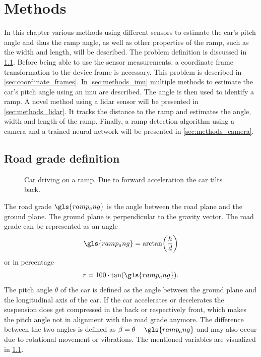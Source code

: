 \chapter{Methods}
\label{ch:Methods}
In this chapter various methods using different sensors to estimate the car's pitch angle and thus the ramp angle, as well as other properties of the ramp, such as the width and length, will be described.
The problem definition is discussed in \cref{sec:road_grade_definition}.
Before being able to use the sensor measurements, a coordinate frame transformation to the device frame is necessary.
This problem is described in \cref{sec:coordinate_frames}.
In \cref{sec:methods_imu} multiple methods to estimate the car's pitch angle using an \gls{imu} are described.
The angle is then used to identify a ramp.
A novel method using a \gls{lidar} sensor will be presented in \cref{sec:methods_lidar}.
It tracks the distance to the ramp and estimates the angle, width and length of the ramp.
Finally, a ramp detection algorithm using a camera and a trained neural network will be presented in \cref{sec:methods_camera}.


\section{Road grade definition}
\label{sec:road_grade_definition}
\begin{figure}[htb]
	\centering
	
	\caption[Ramp angle definition]{Car driving on a ramp. Due to forward acceleration the car tilts back.}
	\label{fig:tikz_car_tilt}
\end{figure}
The road grade $\gls{ramp_ang}$ is the angle between the road plane and the ground plane.
The ground plane is perpendicular to the gravity vector.
The road grade can be represented as an angle
\begin{equation}
	\gls{ramp_ang} = \arctan(\frac{h}{d})
\end{equation}
or in percentage
\begin{equation}
	r = 100\cdot\tan(\gls{ramp_ang}).
\end{equation}
The pitch angle $\theta$ of the car is defined as the angle between the ground plane and the longitudinal axis of the car.
If the car accelerates or decelerates the suspension does get compressed in the back or respectively front, which makes the pitch angle not in alignment with the road grade anymore.
The difference between the two angles is defined as $\beta = \theta- \gls{ramp_ang}$ and may also occur due to rotational movement or vibrations.
The mentioned variables are visualized in \cref{fig:tikz_car_tilt}.



